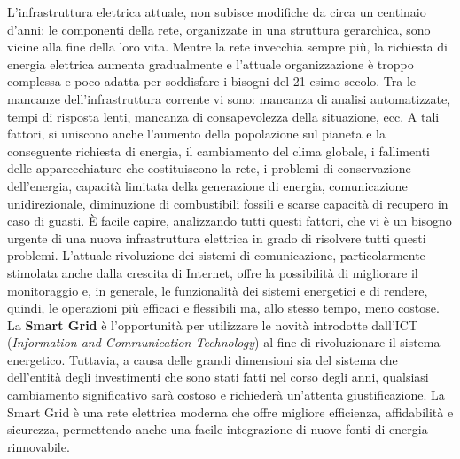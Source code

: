 L'infrastruttura elettrica attuale, non subisce modifiche da circa un centinaio d'anni: le componenti della rete, organizzate in una struttura gerarchica, sono vicine alla fine della loro vita. \newline Mentre la rete invecchia sempre più, la richiesta di energia elettrica aumenta gradualmente e l'attuale organizzazione è troppo complessa e poco adatta per soddisfare i bisogni del 21-esimo secolo. \newline Tra le mancanze dell'infrastruttura corrente vi sono: mancanza di analisi automatizzate, tempi di risposta lenti, mancanza di consapevolezza della situazione, ecc. A tali fattori, si uniscono anche l'aumento della popolazione sul pianeta e la conseguente richiesta di energia, il cambiamento del clima globale, i fallimenti delle apparecchiature che costituiscono la rete, i problemi di conservazione dell'energia, capacità limitata della generazione di energia, comunicazione unidirezionale, diminuzione di combustibili fossili e scarse capacità di recupero in caso di guasti. \newline È facile capire, analizzando tutti questi fattori, che vi è un bisogno urgente di una nuova infrastruttura elettrica in grado di risolvere tutti questi problemi. \newline \newline
L'attuale rivoluzione dei sistemi di comunicazione, particolarmente stimolata anche dalla crescita di Internet, offre la possibilità di migliorare il monitoraggio e, in generale, le funzionalità dei sistemi energetici e di rendere, quindi, le operazioni più efficaci e flessibili ma, allo stesso tempo, meno costose. \newline
La \textbf{Smart Grid} è l'opportunità per utilizzare le novità introdotte dall'ICT   (\textit{Information and Communication Technology}) al fine di rivoluzionare il sistema energetico. Tuttavia, a causa delle grandi dimensioni sia del sistema che dell'entità degli investimenti che sono stati fatti nel corso degli anni, qualsiasi cambiamento significativo sarà costoso e richiederà un'attenta giustificazione. \newline La Smart Grid è una rete elettrica moderna che offre migliore efficienza, affidabilità e sicurezza, permettendo anche una facile integrazione di nuove fonti di energia rinnovabile. 
